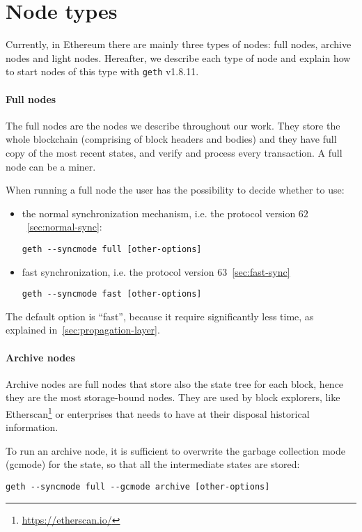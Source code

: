 \section{Node types}
\label{sec:node-types}
Currently, in Ethereum there are mainly three types of nodes: full nodes,
archive nodes and light nodes. Hereafter, we describe each type of node and
explain how to start nodes of this type with \texttt{geth} v1.8.11.

\paragraph{Full nodes}
The full nodes are the nodes we describe throughout our work. They store the
whole blockchain (comprising of block headers and bodies) and they have full
copy of the most recent states, and verify and process every transaction. A full
node can be a miner.

When running a full node the user has the possibility to decide whether to use:
\begin{itemize}
    \item the normal synchronization mechanism, i.e. the protocol version 
    $62$~\autoref{sec:normal-sync}:
    \begin{center}
        \verb|geth --syncmode full [other-options]|
    \end{center}
    \item fast synchronization, i.e. the protocol version 
    $63$~\autoref{sec:fast-sync}
    \begin{center}
        \verb|geth --syncmode fast [other-options]|
    \end{center}
\end{itemize}
The default option is ``fast'', because it require significantly less time, as 
explained in~\autoref{sec:propagation-layer}.

\paragraph{Archive nodes}
Archive nodes are full nodes that store also the state tree for each block,
hence they are the most storage-bound nodes. They are used by block explorers,
like Etherscan\footnote{\url{https://etherscan.io/}} or enterprises that needs
to have at their disposal historical information.

To run an archive node, it is sufficient to overwrite the garbage collection
mode (gcmode) for the state, so that all the intermediate states are stored:
\begin{center}
\verb|geth --syncmode full --gcmode archive [other-options]|
\end{center}

